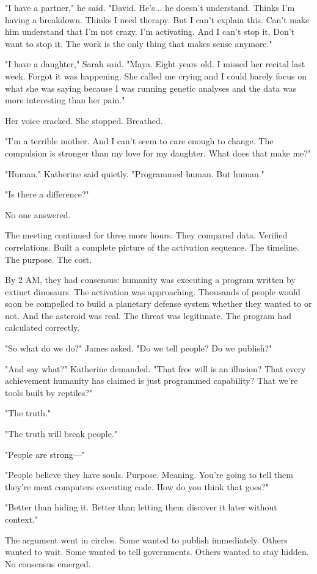 "I have a partner," he said. "David. He's... he doesn't understand. Thinks I'm having a breakdown. Thinks I need therapy. But I can't explain this. Can't make him understand that I'm not crazy. I'm activating. And I can't stop it. Don't want to stop it. The work is the only thing that makes sense anymore."

"I have a daughter," Sarah said. "Maya. Eight years old. I missed her recital last week. Forgot it was happening. She called me crying and I could barely focus on what she was saying because I was running genetic analyses and the data was more interesting than her pain."

Her voice cracked. She stopped. Breathed.

"I'm a terrible mother. And I can't seem to care enough to change. The compulsion is stronger than my love for my daughter. What does that make me?"

"Human," Katherine said quietly. "Programmed human. But human."

"Is there a difference?"

No one answered.

The meeting continued for three more hours. They compared data. Verified correlations. Built a complete picture of the activation sequence. The timeline. The purpose. The cost.

By 2 AM, they had consensus: humanity was executing a program written by extinct dinosaurs. The activation was approaching. Thousands of people would soon be compelled to build a planetary defense system whether they wanted to or not. And the asteroid was real. The threat was legitimate. The program had calculated correctly.

"So what do we do?" James asked. "Do we tell people? Do we publish?"

"And say what?" Katherine demanded. "That free will is an illusion? That every achievement humanity has claimed is just programmed capability? That we're tools built by reptiles?"

"The truth."

"The truth will break people."

"People are strong—"

"People believe they have souls. Purpose. Meaning. You're going to tell them they're meat computers executing code. How do you think that goes?"

"Better than hiding it. Better than letting them discover it later without context."

The argument went in circles. Some wanted to publish immediately. Others wanted to wait. Some wanted to tell governments. Others wanted to stay hidden. No consensus emerged.


